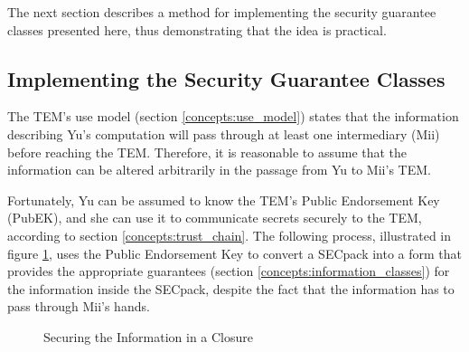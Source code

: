 The next section describes a method for implementing the security guarantee
classes presented here, thus demonstrating that the idea is practical.

\subsection{Implementing the Security Guarantee
Classes}\label{concepts:secpack_binding}

The TEM's use model (section \ref{concepts:use_model}) states that the
information describing Yu's computation will pass through at least one
intermediary (Mii) before reaching the TEM. Therefore, it is reasonable to
assume that the information can be altered arbitrarily in the passage from Yu
to Mii's TEM.

Fortunately, Yu can be assumed to know the TEM's Public Endorsement Key
(PubEK), and she can use it to communicate secrets securely to the TEM,
according to section \ref{concepts:trust_chain}. The following process,
illustrated in figure \ref{fig:secpack_binding}, uses the Public Endorsement Key to
convert a SECpack into a form that provides the appropriate guarantees (section
\ref{concepts:information_classes}) for the information inside the SECpack,
despite the fact that the information has to pass through Mii's hands.

\begin{figure}[hbtp]
	\caption{Securing the Information in a Closure}
	\label{fig:secpack_binding}
\end{figure}


